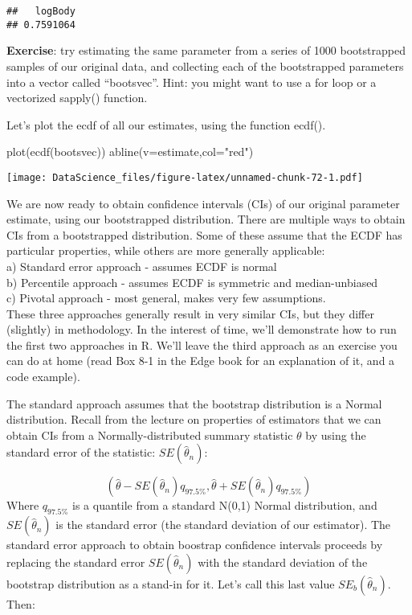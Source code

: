 \documentclass[
]{book}
\newenvironment{Shaded}{\begin{snugshade}}{\end{snugshade}}
\newcommand{\AttributeTok}[1]{\textcolor[rgb]{0.77,0.63,0.00}{#1}}
\newcommand{\FunctionTok}[1]{\textcolor[rgb]{0.00,0.00,0.00}{#1}}
\newcommand{\NormalTok}[1]{#1}
\newcommand{\StringTok}[1]{\textcolor[rgb]{0.31,0.60,0.02}{#1}}
\begin{document}
\begin{verbatim}
##   logBody 
## 0.7591064
\end{verbatim}

\textbf{Exercise}: try estimating the same parameter from a series of 1000 bootstrapped samples of our original data, and collecting each of the bootstrapped parameters into a vector called ``bootsvec''. Hint: you might want to use a for loop or a vectorized sapply() function.

Let's plot the ecdf of all our estimates, using the function ecdf().

\begin{Shaded}
\begin{Highlighting}[]
\FunctionTok{plot}\NormalTok{(}\FunctionTok{ecdf}\NormalTok{(bootsvec))}
\FunctionTok{abline}\NormalTok{(}\AttributeTok{v=}\NormalTok{estimate,}\AttributeTok{col=}\StringTok{"red"}\NormalTok{)}
\end{Highlighting}
\end{Shaded}

\texttt{[image: DataScience\_files/figure-latex/unnamed-chunk-72-1.pdf]}

We are now ready to obtain confidence intervals (CIs) of our original parameter estimate, using our bootstrapped distribution. There are multiple ways to obtain CIs from a bootstrapped distribution. Some of these assume that the ECDF has particular properties, while others are more generally applicable:\\
a) Standard error approach - assumes ECDF is normal\\
b) Percentile approach - assumes ECDF is symmetric and median-unbiased\\
c) Pivotal approach - most general, makes very few assumptions.\\
These three approaches generally result in very similar CIs, but they differ (slightly) in methodology. In the interest of time, we'll demonstrate how to run the first two approaches in R. We'll leave the third approach as an exercise you can do at home (read Box 8-1 in the Edge book for an explanation of it, and a code example).

The standard approach assumes that the bootstrap distribution is a Normal distribution. Recall from the lecture on properties of estimators that we can obtain CIs from a Normally-distributed summary statistic \(\theta\) by using the standard error of the statistic: \(SE(\hat{\theta}_n)\):

\[(\hat{\theta} - SE(\hat{\theta}_n)q_{97.5\%}, \hat{\theta} + SE(\hat{\theta}_n)q_{97.5\%})\]
Where \(q_{97.5\%}\) is a quantile from a standard N(0,1) Normal distribution, and \(SE(\hat{\theta}_n)\) is the standard error (the standard deviation of our estimator). The standard error approach to obtain boostrap confidence intervals proceeds by replacing the standard error \(SE(\hat{\theta}_n)\) with the standard deviation of the bootstrap distribution as a stand-in for it. Let's call this last value \(SE_b(\hat{\theta}_n)\). Then:
\end{document}

